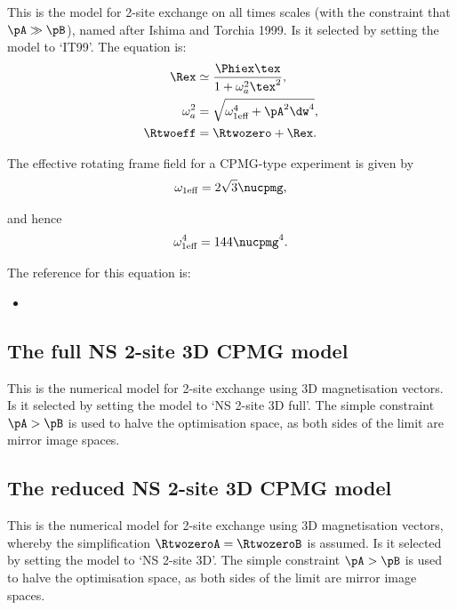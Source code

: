 This is the model for 2-site exchange on all times scales (with the constraint that $\pA \gg \pB$), named after Ishima and Torchia 1999.  Is it selected by setting the model to `IT99'.  The equation is:
\begin{align}
    \Rex       &\simeq \frac{\Phiex\tex}{1 + \omega_a^2\tex^2} , \\
    \omega_a^2 &= \sqrt{\omega_\textrm{1eff}^4 + \pA^2\dw^4} , \\
    \Rtwoeff   &= \Rtwozero + \Rex .
\end{align}

The effective rotating frame field for a CPMG-type experiment is given by
\begin{equation}
    \omega_\textrm{1eff} = 2\sqrt{3}\nucpmg ,
\end{equation}

and hence
\begin{equation}
    \omega_\textrm{1eff}^4 = 144\nucpmg^4 .
\end{equation}

The reference for this equation is:
\begin{itemize}
\item {}
\end{itemize}



\subsection{The full NS 2-site 3D CPMG model}
\label{sect: dispersion: NS 2-site 3D full model}

This is the numerical model for 2-site exchange using 3D magnetisation vectors.
Is it selected by setting the model to `NS 2-site 3D full'.
The simple constraint $\pA > \pB$ is used to halve the optimisation space, as both sides of the limit are mirror image spaces.



\subsection{The reduced NS 2-site 3D CPMG model}
\label{sect: dispersion: NS 2-site 3D model}

This is the numerical model for 2-site exchange using 3D magnetisation vectors, whereby the simplification $\RtwozeroA = \RtwozeroB$ is assumed.
Is it selected by setting the model to `NS 2-site 3D'.
The simple constraint $\pA > \pB$ is used to halve the optimisation space, as both sides of the limit are mirror image spaces.


